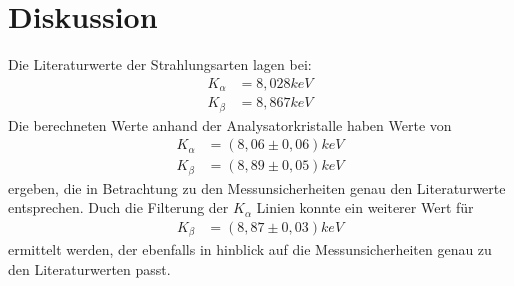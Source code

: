 \documentclass[
	a4paper,
	12pt,
	pagesize,
	ngerman
]{scrartcl}
\begin{document}
\section{Diskussion}
Die Literaturwerte der Strahlungsarten lagen bei:
\begin{align*}
    K_{\alpha} &= 8,028 keV \\
    K_{\beta} &= 8,867 keV
\end{align*}
Die berechneten Werte anhand der Analysatorkristalle haben Werte von
\begin{align*}
    K_{\alpha} &= (8,06 \pm 0,06) keV \\
    K_{\beta} &= (8,89 \pm 0,05) keV
\end{align*}
ergeben, die in Betrachtung zu den Messunsicherheiten genau den Literaturwerte entsprechen. Duch die Filterung der $K_{\alpha}$ Linien konnte ein weiterer Wert für 
\begin{align*}
    K_{\beta} &= (8,87 \pm 0,03)keV
\end{align*}
ermittelt werden, der ebenfalls in hinblick auf die Messunsicherheiten genau zu den Literaturwerten passt.
\end{document}
